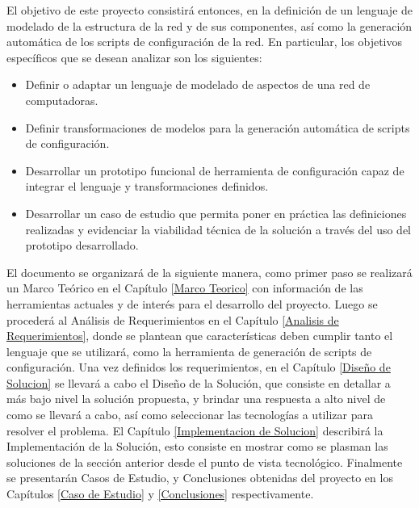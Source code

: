 El objetivo de este proyecto consistirá entonces, en la definición de un lenguaje de modelado de la estructura de la red y de sus componentes, así como la generación automática de los scripts de configuración de la red. En particular, los objetivos específicos que se desean analizar son los siguientes:
\begin{itemize}
    \item Definir o adaptar un lenguaje de modelado de aspectos de una red de computadoras.
    
    \item Definir transformaciones de modelos para la generación automática de scripts de configuración.
    
    \item Desarrollar un prototipo funcional de herramienta de configuración capaz de integrar el lenguaje y transformaciones definidos.
    
    \item Desarrollar un caso de estudio que permita poner en práctica las definiciones realizadas y evidenciar la viabilidad técnica de la solución a través del uso del prototipo desarrollado.
\end{itemize}

El documento se organizará de la siguiente manera, como primer paso se realizará un Marco Teórico en el Capítulo \ref{Marco Teorico} con información de las herramientas actuales y de interés para el desarrollo del proyecto.
Luego se procederá al Análisis de Requerimientos en el Capítulo \ref{Analisis de Requerimientos}, donde se plantean  que características deben cumplir tanto el lenguaje que se utilizará, como la herramienta de generación de scripts de configuración.
Una vez definidos los requerimientos, en el Capítulo \ref{Diseño de Solucion} se llevará a cabo el Diseño de la Solución, que consiste en detallar a más bajo nivel la solución propuesta, y brindar una respuesta a alto nivel de como se llevará a cabo, así como seleccionar las tecnologías a utilizar para resolver el problema.
El Capítulo \ref{Implementacion de Solucion} describirá la Implementación de la Solución, esto consiste en mostrar como se plasman las soluciones de la sección anterior desde el punto de vista tecnológico.
Finalmente se presentarán Casos de Estudio, y Conclusiones obtenidas del proyecto en los Capítulos \ref{Caso de Estudio} y \ref{Conclusiones} respectivamente.

